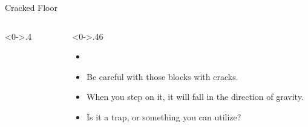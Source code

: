 \documentclass[notheorems]{beamer}
\begin{document}
\begin{framenl}{Cracked Floor}
\begin{columns}[T] %
\begin{column}<0->{.4\textwidth}
\begin{figure}[thpb]
\centering
{}

\end{figure}
\end{column}%
\hfill%
\begin{column}<0->{.46\textwidth}
\begin{itemize}
\item []
\item<1-> Be careful with those blocks with cracks.
\item<2-> When you step on it, it will fall in the direction of gravity.
\item<3-> Is it a trap, or something you can utilize?
\end{itemize}
\end{column}%
\end{columns}
\end{framenl}
\end{document}
